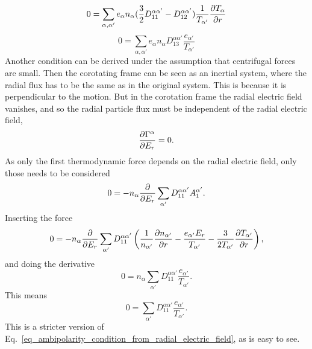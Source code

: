 \begin{equation}
  0 = \sum_{\alpha, \alpha'} e_{\alpha} n_{\alpha} (\frac{3}{2} D_{11}^{\alpha\alpha'} - D_{12}^{\alpha\alpha'}) \frac{1}{T_{\alpha'}} \frac{\partial T_{\alpha}}{\partial r}
\end{equation}
\begin{equation}
  0 = \sum_{\alpha, \alpha'} e_{\alpha} n_{\alpha} D_{13}^{\alpha\alpha'} \frac{e_{\alpha'}}{T_{\alpha'}}
\end{equation}
Another condition can be derived under the assumption that centrifugal
forces are small. Then the corotating frame can be seen as an inertial
system, where the radial flux has to be the same as in the original
system. This is because it is perpendicular to the motion. But in the
corotation frame the radial electric field vanishes, and so the radial
particle flux must be independent of the radial electric field,
\begin{equation}
  \frac{\partial \Gamma^{\alpha}}{\partial E_r} = 0.
\end{equation}
As only the first thermodynamic force depends on the radial electric
field, only those needs to be considered
\begin{equation}
  0 = - n_{\alpha} \frac{\partial }{\partial E_r} \sum_{\alpha'} D_{11}^{\alpha\alpha'} A_1^{\alpha'}.
\end{equation}
Inserting the force
\begin{equation}
  0 = - n_{\alpha} \frac{\partial }{\partial E_r} \sum_{\alpha'} D_{11}^{\alpha\alpha'} \left( \frac{1}{n_{\alpha'}} \frac{\partial n_{\alpha'}}{\partial r} - \frac{e_{\alpha'} E_r}{T_{\alpha'}} - \frac{3}{2 T_{\alpha'}} \frac{\partial T_{\alpha'}}{\partial r} \right),
\end{equation}
and doing the derivative
\begin{equation}
  0 = n_{\alpha} \sum_{\alpha'} D_{11}^{\alpha\alpha'} \frac{e_{\alpha'}}{T_{\alpha'}}.
\end{equation}
This means
\begin{equation}
  0 = \sum_{\alpha'} D_{11}^{\alpha\alpha'} \frac{e_{\alpha'}}{T_{\alpha'}}.
\end{equation}
This is a stricter version of
Eq.~\eqref{eq_ambipolarity_condition_from_radial_electric_field}, as is
easy to see.

